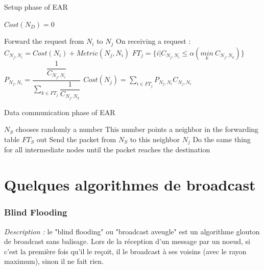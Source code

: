 \begin{algorithm}[H]
\caption{Setup phase of EAR}
\label{algo_EAR_sp}
\begin{algorithmic}

\STATE $Cost(N_D) = 0$

			\STATE Forward the request from $N_i$ to $N_j$
		\ENDIF
	\ENDFOR
\ENDFOR
\STATE
{}
		\STATE On receiving a request :
		\STATE $C_{N_j,N_i} = Cost(N_i)+Metric(N_j,N_i)$
		\STATE $FT_j = \{i | C_{N_j,N_i} \leq \alpha (\underset{k}{min}\ C_{N_j,N_k})\}$
		\STATE
		\STATE $P_{N_j,N_i} = \dfrac{\dfrac{1}{C_{N_j,N_i}}}{\sum \limits_{k \in FT_j} \dfrac{1}{C_{N_j,N_k}}}$
		\STATE
		\STATE $Cost(N_j) = \sum \limits_{i \in FT_j} {P_{N_j,N_i} C_{N_j,N_i}}$
	\ENDFOR
\ENDFOR
\end{algorithmic}
\end{algorithm}


\begin{algorithm}[H]
\caption{Data communication phase of EAR}
\label{algo_EAR_dcp}
\begin{algorithmic}

\STATE $N_S$ chooses randomly a number
\STATE This number points a neighbor in the forwarding table $FT_S$ out
\STATE Send the packet from $N_S$ to this neighbor $N_j$
\STATE Do the same thing for all intermediate nodes until the packet reaches the destination

\end{algorithmic}
\end{algorithm}



\section{Quelques algorithmes de broadcast}

\subsubsection{Blind Flooding\label{blind_flooding}}


\emph{Description :} le "blind flooding" ou "broadcast aveugle" est un algorithme glouton de broadcast sans balisage. Lors de la réception d'un message par un noeud, si c'est la première fois qu'il le reçoit, il le broadcast à ses voisins (avec le rayon maximum), sinon il ne fait rien.

